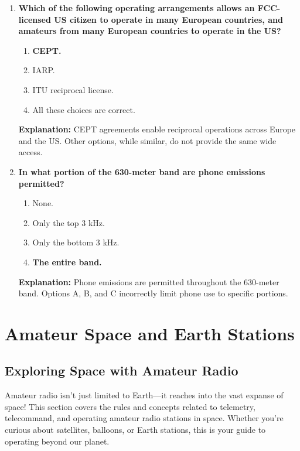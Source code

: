 \begin{enumerate}
    \item \textbf{Which of the following operating arrangements allows an FCC-licensed US citizen to operate in many European countries, and amateurs from many European countries to operate in the US?}
    \begin{enumerate}
        \item \textbf{CEPT.}\\
        \item IARP.\\
        \item ITU reciprocal license.\\
        \item All these choices are correct.
    \end{enumerate}
    \textbf{Explanation:} CEPT agreements enable reciprocal operations across Europe and the US. Other options, while similar, do not provide the same wide access.

    \item \textbf{In what portion of the 630-meter band are phone emissions permitted?}
    \begin{enumerate}
        \item None.\\
        \item Only the top 3 kHz.\\
        \item Only the bottom 3 kHz.\\
        \item \textbf{The entire band.}
    \end{enumerate}
    \textbf{Explanation:} Phone emissions are permitted throughout the 630-meter band. Options A, B, and C incorrectly limit phone use to specific portions.
\end{enumerate}

\section{Amateur Space and Earth Stations}

\subsection*{Exploring Space with Amateur Radio}
Amateur radio isn't just limited to Earth—it reaches into the vast expanse of space! This section covers the rules and concepts related to telemetry, telecommand, and operating amateur radio stations in space. Whether you're curious about satellites, balloons, or Earth stations, this is your guide to operating beyond our planet.

